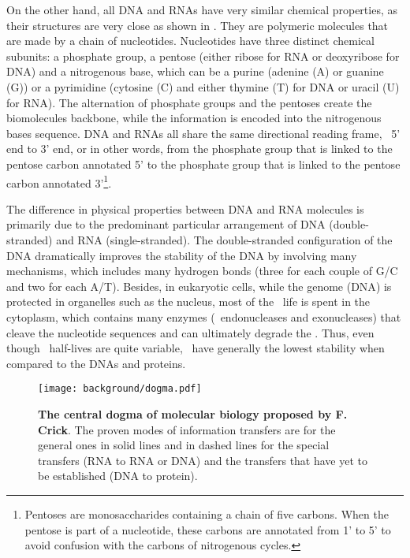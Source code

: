 On the other hand,
all \gls{DNA} and \glspl{RNA} have very similar chemical properties,
as their structures are very close as shown in .
They are polymeric molecules that are made by a chain of nucleotides.
Nucleotides have three distinct chemical subunits: a phosphate group,
a pentose (either ribose for \gls{RNA} or deoxyribose for \gls{DNA})
and a nitrogenous base, which can be a purine (adenine (A) or guanine (G))
or a pyrimidine (cytosine (C) and
either thymine (T) for \gls{DNA} or uracil (U) for \gls{RNA}).
The alternation of phosphate groups and the pentoses create the biomolecules backbone,
while the information is encoded into the nitrogenous bases sequence.
\gls{DNA} and \glspl{RNA} all share the same directional reading frame,
\ie\ 5' end to 3' end, or in other words,
from the phosphate group that is linked to the pentose carbon annotated 5'
to the phosphate group
that is linked to the pentose carbon annotated 3'\footnote{%
Pentoses are monosaccharides containing a chain of five carbons.
When the pentose is part of a nucleotide,
these carbons are annotated from 1' to 5' to avoid confusion
with the carbons of nitrogenous cycles.}.~\mybr\

The difference in physical properties between \gls{DNA} and
\gls{RNA} molecules is primarily due to
the predominant particular arrangement of \gls{DNA} (double-stranded) and
\gls{RNA} (single-stranded).
The double-stranded configuration of the \gls{DNA} dramatically improves
the stability of the \gls{DNA} by involving many mechanisms,
which includes many hydrogen bonds
(three for each couple of G/C and two for each A/T).
Besides,
in eukaryotic cells,
while the genome (\gls{DNA}) is protected in organelles such as the nucleus,
most of the \mRNAs\ life is spent in the cytoplasm,
which contains many enzymes (\eg\ endonucleases and exonucleases)
that cleave the nucleotide sequences and can ultimately degrade the \mRNAs.
Thus, even though \mRNA\ half-lives are quite variable,
\mRNAs\ have generally the lowest stability
when compared to the \glspl{DNA} and proteins.~\mybr\

\begin{figure}[!htbp]
    \texttt{[image: background/dogma.pdf]}\centering
    \vspace{-4mm}
    \caption[Central dogma of molecular biology proposed by F. Crick]%
    {\label{fig:dogma}\textbf{The central dogma of molecular biology proposed by
    F. Crick}. The proven modes of information transfers are for the general ones
    in solid lines and in dashed lines for the special transfers
    (\gls{RNA} to \gls{RNA} or \gls{DNA}) and the transfers that have yet to
    be established (\gls{DNA} to protein).
    }
\end{figure}

